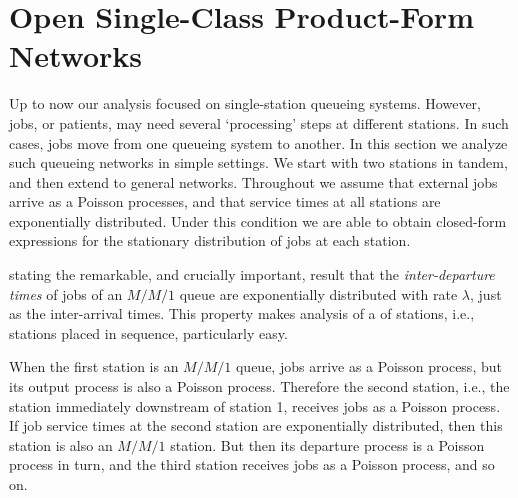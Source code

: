 


\section{Open Single-Class Product-Form Networks}
\label{sec:jackson-networks}


Up to now our analysis focused on single-station queueing systems.
However, jobs, or patients, may need several `processing' steps at different stations.
In such cases, jobs move from one queueing system to another.
In this section we analyze such queueing networks in simple settings.
We start with two stations in tandem, and then extend to general networks.
Throughout we assume that external jobs
arrive as a Poisson processes, and that service times at all stations are exponentially distributed.
Under this condition we are able to obtain closed-form expressions for the stationary distribution of jobs at each station.




 stating the remarkable, and crucially important, result that the \emph{inter-departure times} of jobs of an $M/M/1$ queue are exponentially distributed with rate $\lambda$, just as the inter-arrival times. This property makes analysis of a  of stations, i.e., stations placed in sequence, particularly easy.

When the first station is an $M/M/1$ queue, jobs arrive as a Poisson process, but its output process is also a Poisson process.
Therefore the second station, i.e., the station immediately downstream of station 1, receives jobs as a Poisson process.
If job service times at the second station are exponentially distributed, then this station is also an $M/M/1$ station.
But then its departure process is a Poisson process in turn, and the third station receives jobs as a Poisson process, and so on.


